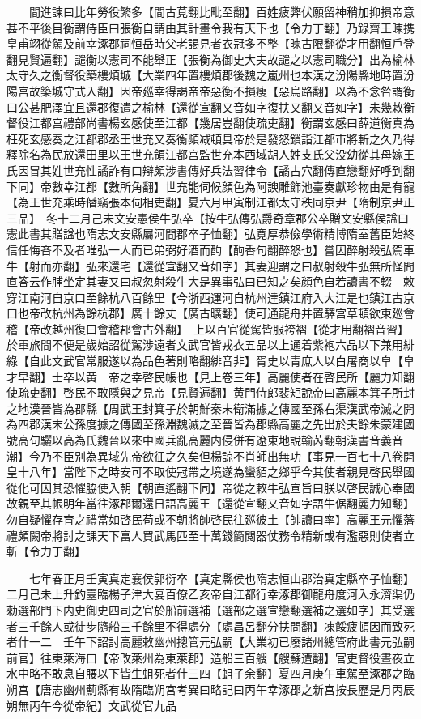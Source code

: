 　　間進諫曰比年勞役繁多【間古莧翻比毗至翻】百姓疲弊伏願留神稍加抑損帝意甚不平後目衡謂侍臣曰張衡自謂由其計畫令我有天下也【令力丁翻】乃錄齊王暕携皇甫翊從駕及前幸涿郡祠恒岳時父老謁見者衣冠多不整【暕古限翻從才用翻恒戶登翻見賢遍翻】譴衡以憲司不能舉正【張衡為御史大夫故譴之以憲司職分】出為榆林太守久之衡督役築樓煩城【大業四年置樓煩郡後魏之嵐州也本漢之汾陽縣地時置汾陽宫故築城守式入翻】因帝廵幸得謁帝帝惡衡不損瘦【惡烏路翻】以為不念咎謂衡曰公甚肥澤宜且還郡復遣之榆林【還從宣翻又音如字復扶又翻又音如字】未幾敕衡督役江都宫禮部尚書楊玄感使至江都【幾居豈翻使疏吏翻】衡謂玄感曰薛道衡真為枉死玄感奏之江都郡丞王世充又奏衡頻减頓具帝於是發怒鎻詣江都市將斬之久乃得釋除名為民放還田里以王世充領江都宫監世充本西域胡人姓支氏父没幼從其母嫁王氏因冒其姓世充性譎詐有口辯頗涉書傳好兵法習律令【譎古穴翻傳直戀翻好呼到翻下同】帝數幸江都【數所角翻】世充能伺候顔色為阿諛雕飾池臺奏獻珍物由是有寵【為王世充乘時僭竊張本伺相吏翻】夏六月甲寅制江都太守秩同京尹【隋制京尹正三品】　冬十二月己未文安憲侯牛弘卒【按牛弘傳弘爵奇章郡公卒贈文安縣侯諡曰憲此書其贈諡也隋志文安縣屬河間郡卒子恤翻】弘寛厚恭儉學術精博隋室舊臣始終信任悔吝不及者唯弘一人而已弟弼好酒而䣱【䣱香句翻醉怒也】嘗因醉射殺弘駕車牛【射而亦翻】弘來還宅【還從宣翻又音如字】其妻迎謂之曰叔射殺牛弘無所怪問直答云作脯坐定其妻又曰叔忽射殺牛大是異事弘曰已知之矣顔色自若讀書不輟　敕穿江南河自京口至餘杭八百餘里【今浙西運河自杭州達鎮江府入大江是也鎮江古京口也帝改杭州為餘杭郡】廣十餘丈【廣古曠翻】使可通龍舟并置驛宫草頓欲東廵會稽【帝改越州復曰會稽郡會古外翻】　上以百官從駕皆服袴褶【從才用翻褶音習】於軍旅間不便是歲始詔從駕涉遠者文武官皆戎衣五品以上通着紫袍六品以下兼用緋綠【自此文武官常服遂以為品色著則略翻緋音非】胥史以青庶人以白屠商以皁【皁才早翻】士卒以黄　帝之幸啓民帳也【見上卷三年】高麗使者在啓民所【麗力知翻使疏吏翻】啓民不敢隱與之見帝【見賢遍翻】黄門侍郎裴矩說帝曰高麗本箕子所封之地漢晉皆為郡縣【周武王封箕子於朝鮮秦末衛滿據之傳國至孫右渠漢武帝滅之開為四郡漢末公孫度據之傳國至孫淵魏滅之至晉皆為郡縣高麗之先出於夫餘朱蒙建國號高句驪以高為氏魏晉以來中國兵亂高麗内侵併有遼東地說輸芮翻朝漢書音義音潮】今乃不臣别為異域先帝欲征之久矣但楊諒不肖師出無功【事見一百七十八卷開皇十八年】當陛下之時安可不取使冠帶之境遂為蠻貊之鄉乎今其使者親見啓民舉國從化可因其恐懼脇使入朝【朝直遙翻下同】帝從之敕牛弘宣旨曰朕以啓民誠心奉國故親至其帳明年當往涿郡爾還日語高麗王【還從宣翻又音如字語牛倨翻麗力知翻】勿自疑懼存育之禮當如啓民苟或不朝將帥啓民往廵彼土【帥讀曰率】高麗王元懼藩禮頗闕帝將討之課天下富人買武馬匹至十萬錢簡閲器仗務令精新或有濫惡則使者立斬【令力丁翻】

　　七年春正月壬寅真定襄侯郭衍卒【真定縣侯也隋志恒山郡治真定縣卒子恤翻】　二月己未上升釣臺臨楊子津大宴百僚乙亥帝自江都行幸涿郡御龍舟度河入永濟渠仍勑選部門下内史御史四司之官於船前選補【選部之選宣戀翻選補之選如字】其受選者三千餘人或徒步隨船三千餘里不得處分【處昌呂翻分扶問翻】凍餒疲頓因而致死者什一二　壬午下詔討高麗敕幽州摠管元弘嗣【大業初已廢諸州總管府此書元弘嗣前官】往東萊海口【帝改萊州為東萊郡】造船三百艘【艘蘇遭翻】官吏督役晝夜立水中略不敢息自腰以下皆生蛆死者什三四【蛆子余翻】夏四月庚午車駕至涿郡之臨朔宫【唐志幽州薊縣有故隋臨朔宮考異曰略記曰丙午幸涿郡之新宫按長歷是月丙辰朔無丙午今從帝紀】文武從官九品

